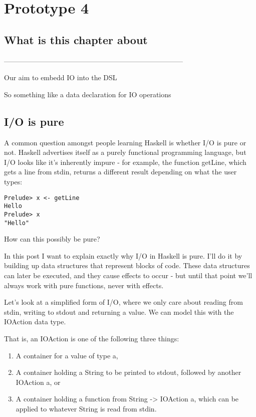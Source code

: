 \documentclass[thesis-solanki.tex]{subfiles}
\begin{document}
\chapter{Prototype 4}{\label{proto4}}


\section{What is this chapter about}

-----------------------------------------------------------------------------

Our aim to embedd IO into the DSL

So something like a data declaration for IO operations

\section{I/O is pure}

\cite{website:ioispurechristaylor}

A common question amongst people learning Haskell is whether I/O is pure or not. Haskell advertises itself as a purely functional 
programming language, but I/O looks like it’s inherently impure - for example, the function getLine, which gets a line from stdin, returns 
a different result depending on what the user types:

\begin{verbatim}
Prelude> x <- getLine
Hello
Prelude> x
"Hello"
\end{verbatim}

How can this possibly be pure?

In this post I want to explain exactly why I/O in Haskell is pure. I’ll do it by building up data structures that represent blocks of code. 
These data structures can later be executed, and they cause effects to occur - but until that point we’ll always work with pure functions, 
never with effects.

Let’s look at a simplified form of I/O, where we only care about reading from stdin, writing to stdout and returning a value. We can model 
this with the IOAction data type.

That is, an IOAction is one of the following three things:
\begin{enumerate}
\item A container for a value of type a,

\item A container holding a String to be printed to stdout, followed by another IOAction a, or

\item A container holding a function from String -> IOAction a, which can be applied to whatever String is read from stdin.
\end{enumerate}
\end{document}

